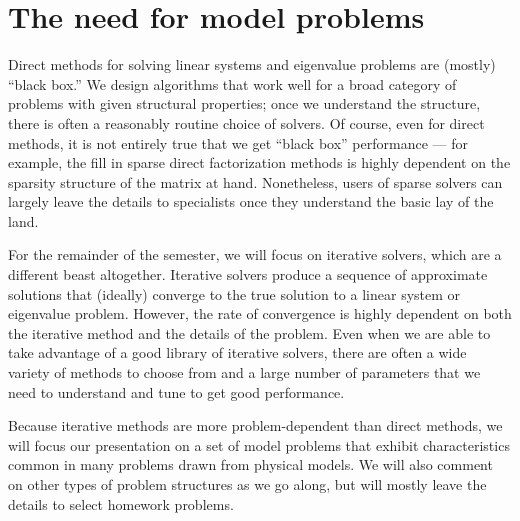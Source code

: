 \section{The need for model problems}

Direct methods for solving linear systems and eigenvalue problems are
(mostly) ``black box.''  We design algorithms that work well for a
broad category of problems with given structural properties; once we
understand the structure, there is often a reasonably routine choice
of solvers.  Of course, even for direct methods, it is not entirely
true that we get ``black box'' performance --- for example, the fill
in sparse direct factorization methods is highly dependent on the
sparsity structure of the matrix at hand.  Nonetheless, users of
sparse solvers can largely leave the details to specialists once they
understand the basic lay of the land.

For the remainder of the semester, we will focus on iterative solvers,
which are a different beast altogether.  Iterative solvers produce a
sequence of approximate solutions that (ideally) converge to the true
solution to a linear system or eigenvalue problem.  However, the rate
of convergence is highly dependent on both the iterative method and
the details of the problem.  Even when we are able to take advantage
of a good library of iterative solvers, there are often a wide variety
of methods to choose from and a large number of parameters that we need
to understand and tune to get good performance.

Because iterative methods are more problem-dependent than direct methods,
we will focus our presentation on a set of model problems that exhibit
characteristics common in many problems drawn from physical models.
We will also comment on other types of problem structures as we go along,
but will mostly leave the details to select homework problems.
